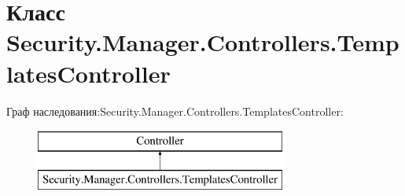 \hypertarget{class_security_1_1_manager_1_1_controllers_1_1_templates_controller}{}\section{Класс Security.\+Manager.\+Controllers.\+Templates\+Controller}
\label{class_security_1_1_manager_1_1_controllers_1_1_templates_controller}
Граф наследования\+:Security.\+Manager.\+Controllers.\+Templates\+Controller\+:\begin{figure}[H]
\begin{center}
\leavevmode
\includegraphics[height=2.000000cm]{da/d35/class_security_1_1_manager_1_1_controllers_1_1_templates_controller}
\end{center}
\end{figure}

